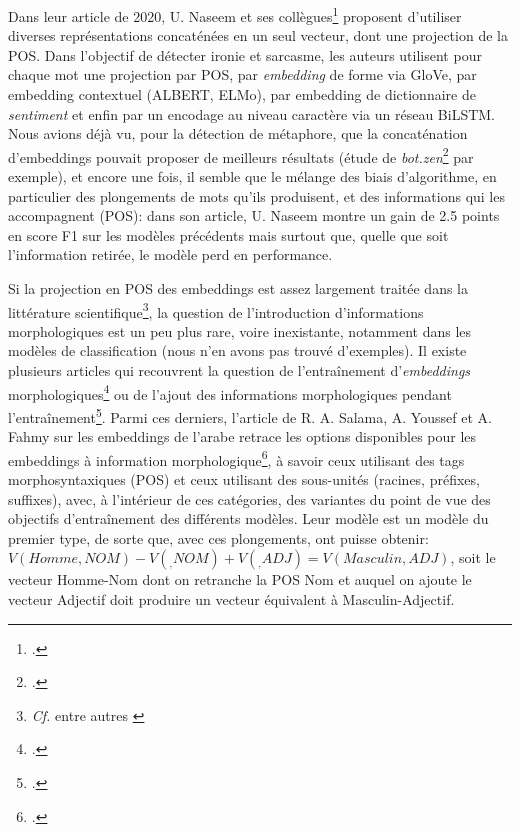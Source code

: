 Dans leur article de 2020, U. Naseem et ses collègues\footcite{naseem_towards_2020} proposent d'utiliser diverses représentations concaténées en un seul vecteur, dont une projection de la POS. Dans l'objectif de détecter ironie et sarcasme, les auteurs utilisent pour chaque mot une projection par POS, par \textit{embedding} de forme via GloVe, par embedding contextuel (ALBERT, ELMo), par embedding de dictionnaire de \textit{sentiment} et enfin par un encodage au niveau caractère via un réseau BiLSTM. Nous avions déjà vu, pour la détection de métaphore, que la concaténation d'embeddings pouvait proposer de meilleurs résultats (étude de \textit{bot.zen}\footcite{stemle_using_2018} par exemple), et encore une fois, il semble que le mélange des biais d'algorithme, en particulier des plongements de mots qu'ils produisent, et des informations qui les accompagnent (POS): dans son article, U. Naseem montre un gain de 2.5 points en score F1 sur les modèles précédents mais surtout que, quelle que soit l'information retirée, le modèle perd en performance.


Si la projection en POS des embeddings est assez largement traitée dans la littérature scientifique\footnote{\textit{Cf.} entre autres \textcite{fell_comparing_2019,leong_report_2018}}, la question de l'introduction d'informations morphologiques est un peu plus rare, voire inexistante, notamment dans les modèles de classification (nous n'en avons pas trouvé d'exemples). Il existe plusieurs articles qui recouvrent la question de l'entraînement d'\textit{embeddings} morphologiques\footcite{cotterell_morphological_2015} ou de l'ajout des informations morphologiques pendant l'entraînement\footcite{cui_knet_2015}. Parmi ces derniers, l'article de R. A. Salama, A. Youssef et A. Fahmy sur les embeddings de l'arabe retrace les options disponibles pour les embeddings à information morphologique\footcite{salama_morphological_2018}, à savoir ceux utilisant des tags morphosyntaxiques (POS) et ceux utilisant des sous-unités (racines, préfixes, suffixes), avec, à l'intérieur de ces catégories, des variantes du point de vue des objectifs d'entraînement des différents modèles. Leur modèle est un modèle du premier type, de sorte que, avec ces plongements, ont puisse obtenir: $V(Homme,NOM) - V(_,NOM) + V(_,ADJ) = V(Masculin,ADJ)$, soit le vecteur Homme-Nom dont on retranche la POS Nom et auquel on ajoute le vecteur Adjectif doit produire un vecteur équivalent à Masculin-Adjectif.

